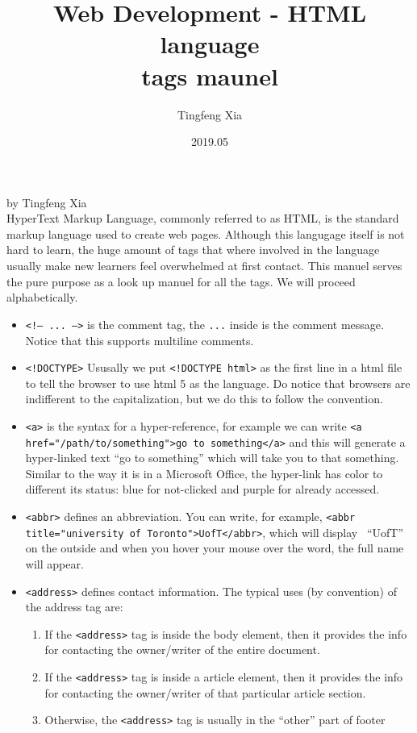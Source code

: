 \documentclass[oneside, 12pt]{article}
\title{%
  \textbf{Web Development - HTML language}\\
  \large tags maunel}
\author{Tingfeng Xia}
\date{2019.05}
\newcommand{\itemm}[1]{\item \texttt{#1}}
\begin{document}
\maketitle
\newpage %
\mbox{}
\vfill
\noindent by Tingfeng Xia \\


\noindent HyperText Markup Language, commonly referred to as HTML, 
is the standard markup language used to create web pages. Although this langugage itself
is not hard to learn, the huge amount of tags that where involved in the language usually make
new learners feel overwhelmed at first contact. This manuel serves the pure purpose as a 
look up manuel for all the tags. We will proceed alphabetically.
\newpage

\begin{itemize}
	\itemm{<!-- ... -->} is the comment tag, the \texttt{...} inside is the comment
	message. Notice that this supports multiline comments.
	\itemm{<!DOCTYPE>} Ususally we put \texttt{<!DOCTYPE html>} as the first line in a html file
	to tell the browser to use html 5 as the language. Do notice that browsers are indifferent
	to the capitalization, but we do this to follow the convention.
	\itemm{<a>} is the syntax for a hyper-reference, for example we can write 
	\texttt{<a href="/path/to/something">go to something</a>} and this will generate a hyper-linked
	text ``go to something'' which will take you to that something. Similar to the way it is
	in a Microsoft Office, the hyper-link has color to different its status: blue for not-clicked
	and purple for already accessed. 
	\itemm{<abbr>} defines an abbreviation. You can write, for example, 
	\texttt{<abbr title="university of Toronto">UofT</abbr>}, which will display \, ``UofT'' on the
	outside and when you hover your mouse over the word, the full name will appear.
	\itemm{<address>} defines contact information. The typical uses (by convention) of the address tag are:
		\begin{enumerate}
			\item If the \texttt{<address>} tag is inside the body element, then it provides the info
			for contacting the owner/writer of the entire document.
			\item If the \texttt{<address>} tag is inside a article element, then it provides the info
			for contacting the owner/writer of that particular article section.
			\item Otherwise, the \texttt{<address>} tag is usually in the ``other'' part of footer 

\end{enumerate}
\end{itemize}
\end{document}
